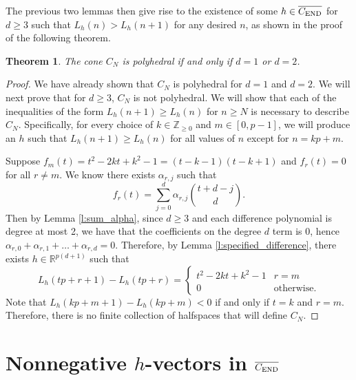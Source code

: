 \documentclass[12pt]{amsart}
\newtheorem{thm}{Theorem}[section]
\theoremstyle{definition}
\numberwithin{equation}{section}
\renewcommand\>{\rangle}
\newcommand\<{\langle}
\newcommand\0{\mathbf{0}}
\newcommand\RR{\mathbb{R}}
\newcommand\ZZ{\mathbb{Z}}
\newcommand{\CEND}{C_\textnormal{END}}
\begin{document}
The previous two lemmas then give rise to the existence of some $h \in \overline{\CEND}$ for $d \geq 3$ such that $L_h(n) > L_h(n+1)$ for any desired $n$, as shown in the proof of the following theorem.

\begin{thm}\label{thm:cnpolyhedral}
 The cone $C_N$ is polyhedral if and only if $d = 1$ or $d=2$.
\end{thm}

\begin{proof}
We have already shown that $C_N$ is polyhedral for $d=1$ and $d=2$. We will next prove that for $d\geq 3$, $C_N$ is not polyhedral. 
We will show that each of the inequalities of the form $L_h(n+1) \geq L_h(n)$ for $n \geq N$ is necessary to describe $C_N$.
Specifically, for every choice of $k \in \ZZ_{\geq 0}$ and $m \in [0,p-1]$, we will produce an $h$ such that $L_h(n+1) \geq L_h(n)$ for all values of $n$ except for $n = kp + m$.

Suppose $f_m(t) = t^2 - 2kt +k^2 -1 = (t-k-1)(t-k+1)$ and $f_r(t) = 0$ for all $r \neq m$. We know there exists $\alpha_{r,j}$ such that
\[f_r(t) = \sum_{j=0}^d \alpha_{r,j} \binom{t+d-j}{d}.\]
Then by Lemma \ref{l:sum_alpha}, since $d \geq 3$ and each difference polynomial is degree at most 2, we have that the coefficients on the degree $d$ term is 0, hence $\alpha_{r,0} + \alpha_{r,1} + \dots + \alpha_{r,d} = 0$. Therefore, by Lemma \ref{l:specified_difference}, there exists $h \in \RR^{p(d+1)}$ such that 
\[L_h(tp+r+1) - L_h(tp+r) = \begin{cases}
	t^2 - 2kt + k^2 -1 & r = m\\
	0 & \text{otherwise}.
\end{cases}\]
Note that $L_h(kp+ m + 1) - L_h(kp+m) < 0$ if and only if $t = k$ and $r = m$. Therefore, there is no finite collection of halfspaces that will define $C_N$.
\end{proof}


\section{Nonnegative $h$-vectors in $\overline{\CEND}$}%
\label{sec:nondecreasingend}%
\end{document}
